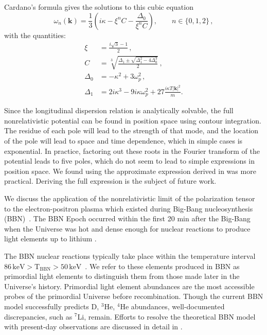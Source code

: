 Cardano's formula gives the solutions to this cubic equation
\begin{equation}\label{eq:cardano}
\omega_n(\boldsymbol{k}) = \frac{1}{3}\left(i\kappa-\xi^n C-\frac{\Delta_0}{\xi^n C}\right), \qquad n \in \{0,1,2\} \,,
\end{equation}
with the quantities:
\begin{align}\label{eq:delta}
  \xi &=\frac{i\sqrt{3}-1}{2}\,,\\
    C &= \sqrt[3]{\frac{\Delta_1 \pm \sqrt{\Delta_1^2 - 4 \Delta_0^3}}2}\,,\\
    \Delta_0 &= -\kappa^2 + 3 \omega_p^2\,,\\
\Delta_1 &= 2i\kappa^3 - 9 i\kappa \omega_p^2 + 27\frac{i\kappa T |\boldsymbol{k}|^2}{m}.
\end{align}

Since the longitudinal dispersion relation is analytically solvable, the full nonrelativistic potential can be found in position space using contour integration. The residue of each pole will lead to the strength of that mode, and the location of the pole will lead to space and time dependence, which in simple cases is exponential. In practice, factoring out these roots in the Fourier transform of the potential leads to five poles, which do not seem to lead to simple expressions in position space. We found using the approximate expression derived in  was more practical. Deriving the full expression is the subject of future work.

We discuss the application of the nonrelativistic limit of the polarization tensor  to the electron-positron plasma which existed during Big-Bang nucleosynthesis (BBN)~\cite{Grayson:2023flr}. The BBN Epoch occurred within the first 20 min after the Big-Bang when the Universe was hot and dense enough for nuclear reactions to produce light elements up to lithium \cite{Pitrou:2018cgg}. 

The BBN nuclear reactions typically take place within the temperature interval $86\, \mathrm{keV}>\mathrm{T_{BBN}}>50\, \mathrm{keV}$~\cite{Pitrou:2018cgg}. We refer to these elements produced in BBN as primordial light elements to distinguish them from those made later in the Universe's history. Primordial light element abundances are the most accessible probes of the primordial Universe before recombination. Though the current BBN model successfully predicts D, $^3$He, $^4$He abundances, well-documented discrepancies, such as $^7$Li, remain. Efforts to resolve the theoretical BBN model with present-day observations are discussed in detail in \cite{Pitrou:2021vqr,Bertulani:2022qly}.


